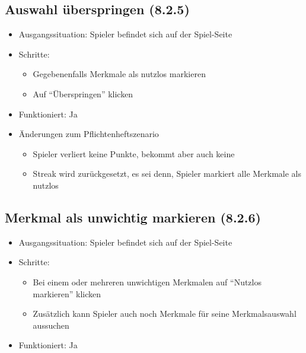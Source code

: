\documentclass[a4paper]{scrreprt}
\begin{document}
            \subsection{Auswahl überspringen (8.2.5)}
            \begin{itemize}
                \item Ausgangssituation: Spieler befindet sich auf der Spiel-Seite
                \item Schritte:
                    \begin{itemize}
                        \item Gegebenenfalls Merkmale als nutzlos markieren
                        \item Auf \enquote{Überspringen} klicken
                    \end{itemize}
                \item Funktioniert: Ja
                \item Änderungen zum Pflichtenheftszenario
                \begin{itemize}
                    \item Spieler verliert keine Punkte, bekommt aber auch keine
                    \item Streak wird zurückgesetzt, es sei denn, Spieler markiert alle Merkmale als nutzlos
                \end{itemize}
            \end{itemize}

            \subsection{Merkmal als unwichtig markieren (8.2.6)}
            \begin{itemize}
                \item Ausgangssituation: Spieler befindet sich auf der Spiel-Seite
                \item Schritte:
                    \begin{itemize}
                        \item Bei einem oder mehreren unwichtigen Merkmalen auf \enquote{Nutzlos markieren} klicken
                        \item Zusätzlich kann Spieler auch noch Merkmale für seine Merkmalsauswahl aussuchen
                    \end{itemize}
                \item Funktioniert: Ja
            \end{itemize}
\end{document}
